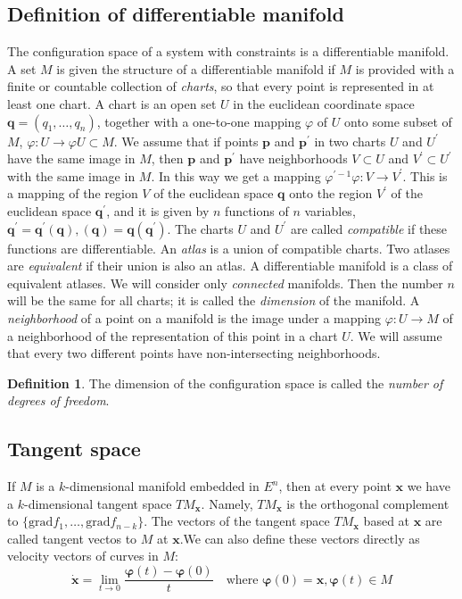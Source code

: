 \documentclass[conference]{IEEEtran}
\theoremstyle{definition}
\newtheorem{definition}{Definition}[section]
\theoremstyle{remark}
\begin{document}
    \subsection{Definition of differentiable manifold}
    The configuration space of a system with constraints is a differentiable manifold. A set $M$ is given the structure of a differentiable manifold if $M$ is provided with a finite or countable collection of \emph{charts}, so that every point is represented in at least one chart. A chart is an open set $U$ in the euclidean coordinate space $\mathbf{q} = (q_1, \dots, q_n)$, together with a one-to-one mapping $\varphi$ of $U$ onto some subset of $M$, $\varphi: U \to \varphi U \subset M$. We assume that if points $\mathbf{p}$ and $\mathbf{p}^\prime$ in two charts $U$ and $U^\prime$ have the same image in $M$, then $\mathbf{p}$ and $\mathbf{p}^\prime$ have neighborhoods $V \subset U$ and $V^\prime \subset U^\prime$ with the same image in $M$. In this way we get a mapping $\varphi^{\prime -1} \varphi: V \to V^\prime$. This is a mapping of the region $V$ of the euclidean space $\mathbf{q}$ onto the region $V^\prime$ of the euclidean space $\mathbf{q}^\prime$, and it is given by $n$ functions of $n$ variables, $\mathbf{q}^\prime = \mathbf{q}^\prime(\mathbf{q}), (\mathbf{q}) = \mathbf{q}(\mathbf{q}^\prime)$. The charts $U$ and $U^\prime$ are called \emph{compatible} if these functions are differentiable. An \emph{atlas} is a union of compatible charts. Two atlases are \emph{equivalent} if their union is also an atlas. A differentiable manifold is a class of equivalent atlases. We will consider only \emph{connected} manifolds. Then the number $n$ will be the same for all charts; it is called the \emph{dimension} of the manifold. A \emph{neighborhood} of a point on a manifold is the image under a mapping $\varphi: U \to M$ of a neighborhood of the representation of this point in a chart $U$. We will assume that every two different points have non-intersecting neighborhoods.

    \begin{definition}
        The dimension of the configuration space is called the \emph{number of degrees of freedom}.
    \end{definition}

    \subsection{Tangent space}
    If $M$ is a $k$-dimensional manifold embedded in $E^n$, then at every point $\mathbf{x}$ we have a $k$-dimensional tangent space $TM_{\mathbf{x}}$. Namely, $TM_{\mathbf{x}}$ is the orthogonal complement to $\{\mathrm{grad} f_1, \dots, \mathrm{grad} f_{n-k}\}$. The vectors of the tangent space $TM_{\mathbf{x}}$ based at $\mathbf{x}$ are called tangent vectos to $M$ at $\mathbf{x}$.We can also define these vectors directly as velocity vectors of curves in $M$:
    \begin{equation*}
        \dot{\mathbf{x}} = \lim_{t \to 0} \dfrac{\bm{\varphi}(t) - \bm{\varphi}(0)}{t} \quad \text{where } \bm{\varphi}(0) = \bm{x}, \bm{\varphi}(t) \in M
    \end{equation*}
\end{document}
